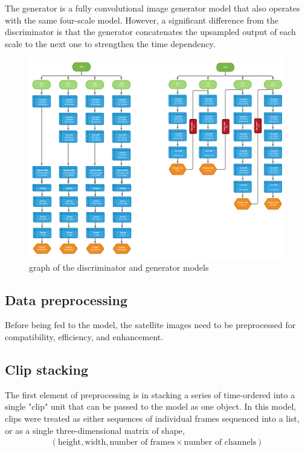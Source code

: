 \documentclass{article}
\begin{document}
The generator is a fully convolutional image generator model that also operates with the same four-scale model. However, a significant difference from the discriminator is that the generator concatenates the upsampled output of each scale to the next one to strengthen the time dependency.

\begin{figure}[H]
    \caption{graph of the discriminator and generator models}
    \centering
    \includegraphics[width=1.0\linewidth]{disc-gen-graph.png}
\end{figure}

\clearpage

\subsection{Data preprocessing}

Before being fed to the model, the satellite images need to be preprocessed for compatibility, efficiency, and enhancement.

\subsection*{Clip stacking}

The first element of preprocessing is in stacking a series of time-ordered into a single "clip" unit that can be passed to the model as one object. In this model, clips were treated as either sequences of individual frames sequenced into a list, or as a single three-dimensional matrix of shape,
\begin{align*}
    (\textrm{height}, \textrm{width}, \textrm{number of frames}
    \times \textrm{number of channels})
\end{align*}
\end{document}
